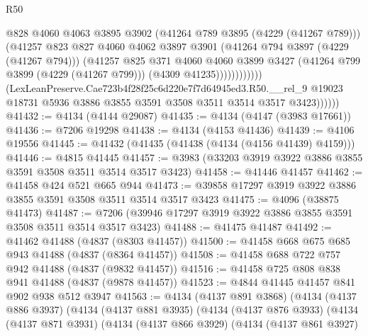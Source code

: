 \begin{lexlean}{R50}
\begin{coremodule}
                                @828
                                @4060
                                @4063
                                @3895
                                @3902
                                (@41264 @789 @3895 (@4229 (@41267 @789)))
                                (@41257
                                  @823
                                  @827
                                  @4060
                                  @4062
                                  @3897
                                  @3901
                                  (@41264 @794 @3897 (@4229 (@41267 @794)))
                                  (@41257
                                    @825
                                    @371
                                    @4060
                                    @4060
                                    @3899
                                    @3427
                                    (@41264 @799 @3899 (@4229 (@41267 @799)))
                                    (@4309 @41235))))))))))))
              (LexLeanPreserve.Cae723b4f28f25c6d220e7f7d64945ed3.R50.__rel_9
                @19023
                @18731
                @5936
                @3886
                @3855
                @3591
                @3508
                @3511
                @3514
                @3517
                @3423))))))
@41432 := @4134 (@4144 @29087)
@41435 := @4134 (@4147 (@3983 @17661))
@41436 := @7206 @19298
@41438 := @4134 (@4153 @41436)
@41439 := @4106 @19556
@41445 := @41432 (@41435 (@41438 (@4134 (@4156 @41439) @4159)))
@41446 := @4815 @41445
@41457 := @3983 (@33203 @3919 @3922 @3886 @3855 @3591 @3508 @3511 @3514 @3517 @3423)
@41458 := @41446 @41457
@41462 := @41458 @424 @521 @665 @944
@41473 := @39858 @17297 @3919 @3922 @3886 @3855 @3591 @3508 @3511 @3514 @3517 @3423
@41475 := @4096 (@38875 @41473)
@41487 := @7206 (@39946 @17297 @3919 @3922 @3886 @3855 @3591 @3508 @3511 @3514 @3517 @3423)
@41488 := @41475 @41487
@41492 := @41462 @41488 (@4837 (@8303 @41457))
@41500 := @41458 @668 @675 @685 @943 @41488 (@4837 (@8364 @41457))
@41508 := @41458 @688 @722 @757 @942 @41488 (@4837 (@9832 @41457))
@41516 := @41458 @725 @808 @838 @941 @41488 (@4837 (@9878 @41457))
@41523 := @4844 @41445 @41457 @841 @902 @938 @512 @3947
@41563 := @4134
    (@4137 @891 @3868)
    (@4134
      (@4137 @886 @3937)
      (@4134
        (@4137 @881 @3935)
        (@4134
          (@4137 @876 @3933)
          (@4134
            (@4137 @871 @3931)
            (@4134
              (@4137 @866 @3929)
              (@4134
                (@4137 @861 @3927)

\end{coremodule}
\end{lexlean}
